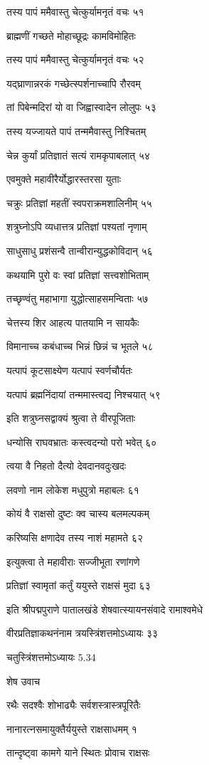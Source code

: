 तस्य पापं ममैवास्तु चेत्कुर्यामनृतं वचः ५१

ब्राह्मणीं गच्छते मोहाच्छूद्रः कामविमोहितः

तस्य पापं ममैवास्तु चेत्कुर्यामनृतं वचः ५२

यद्घ्राणान्नरकं गच्छेत्स्पर्शनाच्चापि रौरवम्

तां पिबेन्मदिरां यो वा जिह्वास्वादेन लोलुपः ५३

तस्य यज्जायते पापं तन्ममैवास्तु निश्चितम्

चेन्न कुर्यां प्रतिज्ञातं सत्यं रामकृपाबलात् ५४

एवमुक्ते महावीरैर्योद्धारस्तरसा युताः

चक्रुः प्रतिज्ञां महतीं स्वपराक्रमशालिनीम् ५५

शत्रुघ्नोऽपि व्यधात्तत्र प्रतिज्ञां पश्यतां नृणाम्

साधुसाधु प्रशंसन्वै तान्वीरान्युद्धकोविदान् ५६

कथयामि पुरो वः स्वां प्रतिज्ञां सत्त्वशोभिताम्

तच्छृण्वंतु महाभागा युद्धोत्साहसमन्विताः ५७

चेत्तस्य शिर आहत्य पातयामि न सायकैः

विमानाच्च कबंधाच्च भिन्नं छिन्नं च भूतले ५८

यत्पापं कूटसाक्ष्येण यत्पापं स्वर्णचौर्यतः

यत्पापं ब्रह्मनिंदायां तन्ममास्त्वद्य निश्चयात् ५९

इति शत्रुघ्नसद्वाक्यं श्रुत्वा ते वीरपूजिताः

धन्योसि राघवभ्रातः कस्त्वदन्यो परो भवेत् ६०

त्वया वै निहतो दैत्यो देवदानवदुःखदः

लवणो नाम लोकेश मधुपुत्रो महाबलः ६१

कोयं वै राक्षसो दुष्टः क्व चास्य बलमल्पकम्

करिष्यसि क्षणादेव तस्य नाशं महामते ६२

इत्युक्त्वा ते महावीराः सज्जीभूता रणांगणे

प्रतिज्ञां स्वामृतां कर्तुं ययुस्ते राक्षसं मुदा ६३

इति श्रीपद्मपुराणे पातालखंडे शेषवात्स्यायनसंवादे रामाश्वमेधे

वीरप्रतिज्ञाकथनंनाम त्रयस्त्रिंशत्तमोऽध्यायः ३३

चतुस्त्रिंशत्तमोऽध्यायः 5.34

शेष उवाच

रथैः सदश्वैः शोभाढ्यैः सर्वशस्त्रास्त्रपूरितैः

नानारत्नसमायुक्तैर्ययुस्ते राक्षसाधमम् १

तान्दृष्ट्वा कामगे याने स्थितः प्रोवाच राक्षसः

